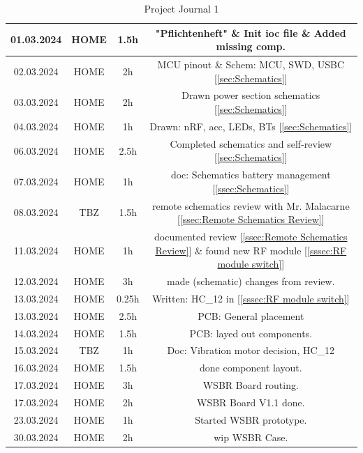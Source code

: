 \begin{table}[H]
\begin{tabular}{||c | c | c || c||}
 \hline
    01.03.2024 & HOME & 1.5h & "Pflichtenheft" \& Init ioc file \& Added missing comp. \\ 
 \hline
    02.03.2024 & HOME & 2h & MCU pinout \& Schem: MCU, SWD, USBC [\ref{sec:Schematics}] \\ 
 \hline
    03.03.2024 & HOME & 2h & Drawn power section schematics [\ref{sec:Schematics}] \\ 
 \hline
    04.03.2024 & HOME & 1h & Drawn: nRF, acc, LEDs, BTs [\ref{sec:Schematics}] \\ 
 \hline
    06.03.2024 & HOME & 2.5h & Completed schematics and self-review [\ref{sec:Schematics}] \\ 
 \hline
    07.03.2024 & HOME & 1h & doc: Schematics battery management [\ref{ssec:Schematics}] \\ 
 \hline
     08.03.2024 & TBZ & 1.5h & remote schematics review with Mr. Malacarne [\ref{ssec:Remote Schematics Review}] \\ 
 \hline
     11.03.2024 & HOME & 1h & documented review [\ref{ssec:Remote Schematics Review}] \& found new RF module [\ref{sssec:RF module switch}] \\ 
 \hline
     12.03.2024 & HOME & 3h & made (schematic) changes from review. \\ 
 \hline
     13.03.2024 & HOME & 0.25h & Written: HC\_12 in [\ref{sssec:RF module switch}] \\ 
 \hline
     13.03.2024 & HOME & 2.5h & PCB: General placement \\ 
 \hline
     14.03.2024 & HOME & 1.5h & PCB: layed out components. \\ 
 \hline
     15.03.2024 & TBZ & 1h & Doc: Vibration motor decision, HC\_12\\ 
 \hline
     16.03.2024 & HOME & 1.5h & done component layout. \\ 
 \hline
     17.03.2024 & HOME & 3h & WSBR Board routing. \\ 
 \hline
     17.03.2024 & HOME & 2h & WSBR Board V1.1 done. \\ 
 \hline
     23.03.2024 & HOME & 1h & Started WSBR prototype. \\ 
 \hline
     30.03.2024 & HOME & 2h & wip WSBR Case. \\ 
 \hline
\end{tabular}
    \caption{Project Journal 1}
    \label{tab:Project Journal 1}
\end{table}




